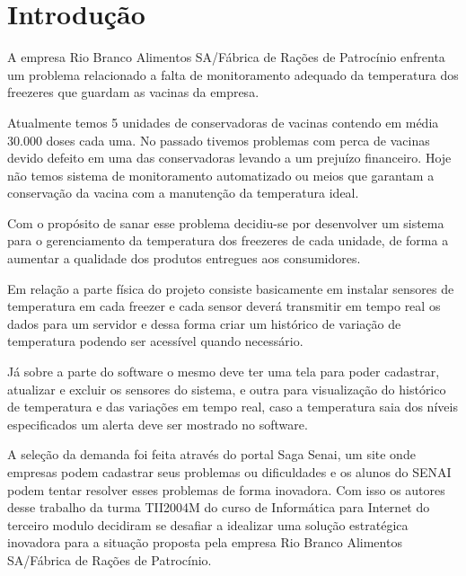 \chapter{Introdução}

    A empresa 
    Rio Branco Alimentos SA/Fábrica de Rações de Patrocínio
    enfrenta um problema relacionado a falta de monitoramento 
    adequado da temperatura dos freezeres que guardam as vacinas
    da empresa.

    \begin{citacao}
        Atualmente temos 5 unidades de conservadoras de vacinas contendo 
        em média 30.000 doses cada uma.
        No passado tivemos problemas com perca de vacinas devido 
        defeito em uma das conservadoras levando a um prejuízo financeiro.
        Hoje não temos sistema de monitoramento automatizado ou meios 
        que garantam a conservação da vacina com a 
        manutenção da temperatura ideal. \cite{senaiDemanda}
    \end{citacao}

    Com o propósito de sanar esse problema decidiu-se por desenvolver
    um sistema para o gerenciamento da temperatura dos freezeres
    de cada unidade, de forma a aumentar a qualidade dos produtos
    entregues aos consumidores.

    Em relação a parte física do projeto consiste basicamente
    em instalar sensores de temperatura em cada freezer
    e cada sensor deverá transmitir 
    em tempo real os dados para um servidor e dessa forma 
    criar um histórico de variação de temperatura podendo 
    ser acessível quando necessário.

    Já sobre a parte do software o mesmo deve ter uma tela para
    poder cadastrar, atualizar e excluir os sensores do sistema, 
    e outra para visualização do histórico de temperatura e 
    das variações em tempo real, 
    caso a temperatura saia dos níveis especificados
    um alerta deve ser mostrado no software.

    A seleção da demanda foi feita através do portal Saga Senai, um 
    site onde empresas podem cadastrar seus problemas ou 
    dificuldades e os alunos do SENAI podem tentar resolver 
    esses problemas de forma inovadora. 
    Com isso os autores desse trabalho da turma TII2004M
    do curso de Informática para Internet do terceiro modulo
    decidiram se desafiar a idealizar
    uma solução estratégica inovadora para a situação 
    proposta pela empresa 
    Rio Branco Alimentos SA/Fábrica de Rações de Patrocínio.
